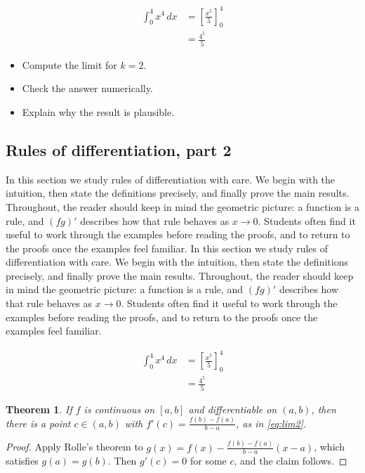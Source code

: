 \documentclass[11pt]{article}
\newtheorem{theorem}{Theorem}[section]
\begin{document}
\begin{align}
  \int_0^{4} x^{4}\,dx &= \left[ \frac{x^{5}}{5} \right]_0^{4} \\
  &= \frac{4^{5}}{5} \label{eq:int2}
\end{align}

\begin{itemize}
  \item Compute the limit for $k = 2$.
  \item Check the answer numerically.
  \item Explain why the result is plausible.
\end{itemize}

\subsection{Rules of differentiation, part 2}

In this section we study rules of differentiation with care. We begin with the intuition, then state the definitions precisely, and finally prove the main results. Throughout, the reader should keep in mind the geometric picture: a function is a rule, and $(fg)'$ describes how that rule behaves as $x \to 0$. Students often find it useful to work through the examples before reading the proofs, and to return to the proofs once the examples feel familiar. In this section we study rules of differentiation with care. We begin with the intuition, then state the definitions precisely, and finally prove the main results. Throughout, the reader should keep in mind the geometric picture: a function is a rule, and $(fg)'$ describes how that rule behaves as $x \to 0$. Students often find it useful to work through the examples before reading the proofs, and to return to the proofs once the examples feel familiar. 

\begin{align}
  \int_0^{4} x^{4}\,dx &= \left[ \frac{x^{5}}{5} \right]_0^{4} \\
  &= \frac{4^{5}}{5} \label{eq:int2}
\end{align}

\begin{theorem}
If $f$ is continuous on $[a,b]$ and differentiable on $(a,b)$, then there is a point $c \in (a,b)$ with $f'(c) = \frac{f(b)-f(a)}{b-a}$, as in \eqref{eq:lim2}.
\end{theorem}

\begin{proof}
Apply Rolle's theorem to $g(x) = f(x) - \frac{f(b)-f(a)}{b-a}(x-a)$, which satisfies $g(a) = g(b)$. Then $g'(c) = 0$ for some $c$, and the claim follows.
\end{proof}
\end{document}
